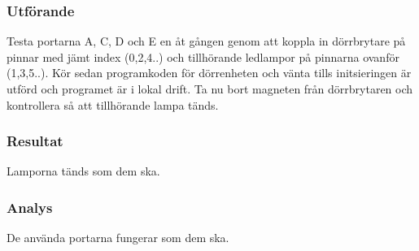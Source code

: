 \subsubsection*{Utförande}
Testa portarna A, C, D och E  en åt gången genom att koppla in dörrbrytare på pinnar med jämt index (0,2,4..) och tillhörande ledlampor på pinnarna ovanför (1,3,5..). Kör sedan programkoden för dörrenheten och vänta tills initsieringen är utförd och programet är i lokal drift. Ta nu bort magneten från dörrbrytaren och kontrollera så att tillhörande lampa tänds.


\subsubsection*{Resultat}
Lamporna tänds som dem ska.



\subsubsection*{Analys}
De använda portarna fungerar som dem ska.



